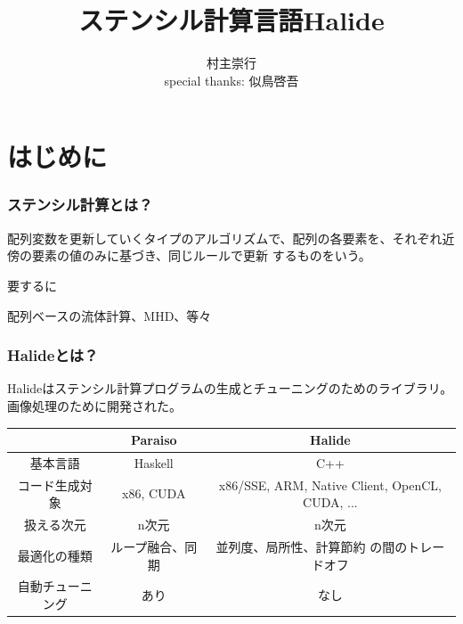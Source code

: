 \documentclass[dvipdfmx,cjk]{beamer}
\begin{document}
\title[Halide]{ステンシル計算言語Halide}
\author[T. Muranushi]{村主崇行\\special thanks: 似鳥啓吾}            %

\begin{frame}                  %
\titlepage                     %
\end{frame}

\begin{frame}                  %
\tableofcontents
\end{frame}

\section{はじめに} 

\begin{frame}\frametitle{ステンシル計算とは？}
配列変数を更新していくタイプのアルゴリズムで、配列の各要素を、それぞれ近傍の要素の値のみに基づき、同じルールで更新
するものをいう。

\pause

要するに

\pause

配列ベースの流体計算、MHD、等々
\end{frame}

\begin{frame}\frametitle{Halideとは？}
Halideはステンシル計算プログラムの生成とチューニングのためのライブラリ。
画像処理のために開発された。\cite{ragan2012decoupling,ragan2013halide}


\begin{center}
  \begin{tabular}{|c|c|c|}
    \hline
    &Paraiso & Halide\\
    \hline
    基本言語 & Haskell & C++ \\
    コード生成対象 & x86, CUDA &
    \multicolumn{1}{p{5cm}|}{x86/SSE, ARM, Native Client, OpenCL, CUDA,  ... }\\
    扱える次元 & n次元 & n次元 \\ 
    最適化の種類 & ループ融合、同期 & \multicolumn{1}{p{5cm}|}{並列度、局所性、計算節約 の間のトレードオフ} \\ 
    自動チューニング & あり & なし \\ 
    \hline
  \end{tabular}
\end{center}
\end{frame}
\end{document}
